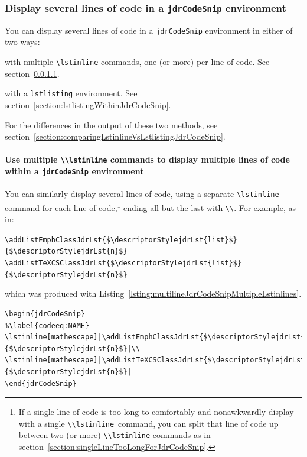 \documentclass[12pt,table,final]{article}%
\begin{document}
\subsubsection{Display several lines of code in a \lstinline|jdrCodeSnip| environment}
\label{section:displaySevealLinesJdrCodeSnip}
You can display several lines of code in a \lstinline|jdrCodeSnip| environment in either of two ways:
\begin{jdr_itemize}
  \item with multiple \lstinline|\lstinline| commands, one (or more) per line of code. See section~\ref{section:multipleLstinlineCommandsJdrCodeSnip}.
  \item with a \lstinline|lstlisting| environment. See section~\ref{section:lstlistingWithinJdrCodeSnip}.
\end{jdr_itemize}

For the differences in the output of these two methods, see section~\ref{section:comparingLstinlineVsLstlistingJdrCodeSnip}.

\paragraph{Use multiple \lstinline|\\lstinline| commands to display multiple lines of code within a \lstinline|jdrCodeSnip| environment}
\label{section:multipleLstinlineCommandsJdrCodeSnip}
You can similarly display several lines of code, using a separate \lstinline|\lstinline| command for each line of code,\footnote{If a single line of code is too long to comfortably and nonawkwardly display with a single \mbox{\lstinline|\\lstinline| command}, you can split that line of code up between two (or more) \lstinline|\\lstinline| commands as in section~\ref{section:singleLineTooLongForJdrCodeSnip}.} ending all but the last with \lstinline|\\|. For example, as in:
\begin{jdrCodeSnip}
\lstinline[mathescape]|\addListEmphClassJdrLst{$\descriptorStylejdrLst{list}$}{$\descriptorStylejdrLst{n}$}|\\
\lstinline[mathescape]|\addListTeXCSClassJdrLst{$\descriptorStylejdrLst{list}$}{$\descriptorStylejdrLst{n}$}|
\end{jdrCodeSnip}
which was produced with Listing~\ref{lsting:multilineJdrCodeSnipMultipleLstinlines}.
\begin{lstlisting}[caption={Typesetting multiple lines of code with multiple \lstinline|\\lstinline| commands},%
                    label=lsting:multilineJdrCodeSnipMultipleLstinlines]
\begin{jdrCodeSnip}
%\label{codeeq:NAME}
\lstinline[mathescape]|\addListEmphClassJdrLst{$\descriptorStylejdrLst{list}$}{$\descriptorStylejdrLst{n}$}|\\
\lstinline[mathescape]|\addListTeXCSClassJdrLst{$\descriptorStylejdrLst{list}$}{$\descriptorStylejdrLst{n}$}|
\end{jdrCodeSnip}
\end{lstlisting}
\end{document}
